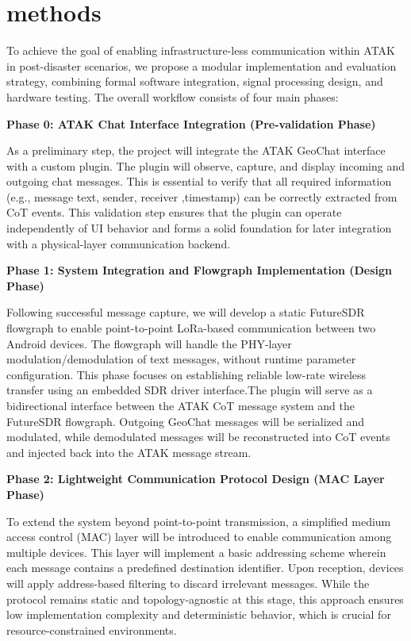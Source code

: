 \section{methods}
To achieve the goal of enabling infrastructure-less communication within ATAK in post-disaster scenarios, we propose a modular implementation and evaluation strategy, combining formal software integration, signal processing design, and hardware testing. The overall workflow consists of four main phases:

\vspace{0.5em}
\noindent\textbf{Phase 0: ATAK Chat Interface Integration (Pre-validation Phase)}\par
As a preliminary step, the project will integrate the ATAK GeoChat interface with a custom plugin. The plugin will observe, capture, and display incoming and outgoing chat messages. This is essential to verify that all required information (e.g., message text, sender, receiver ,timestamp) can be correctly extracted from CoT events. This validation step ensures that the plugin can operate independently of UI behavior and forms a solid foundation for later integration with a physical-layer communication backend.

\vspace{0.5em}
\noindent\textbf{Phase 1: System Integration and Flowgraph Implementation (Design Phase)}\par
Following successful message capture, we will develop a static FutureSDR flowgraph to enable point-to-point LoRa-based communication between two Android devices. The flowgraph will handle the PHY-layer modulation/demodulation of text messages, without runtime parameter configuration. This phase focuses on establishing reliable low-rate wireless transfer using an embedded SDR driver interface.The plugin will serve as a bidirectional interface between the ATAK CoT message system and the FutureSDR flowgraph. Outgoing GeoChat messages will be serialized and modulated, while demodulated messages will be reconstructed into CoT events and injected back into the ATAK message stream.

\vspace{0.5em}
\noindent\textbf{Phase 2: Lightweight Communication Protocol Design (MAC Layer Phase)}\par
To extend the system beyond point-to-point transmission, a simplified medium access control (MAC) layer will be introduced to enable communication among multiple devices. This layer will implement a basic addressing scheme wherein each message contains a predefined destination identifier. Upon reception, devices will apply address-based filtering to discard irrelevant messages. While the protocol remains static and topology-agnostic at this stage, this approach ensures low implementation complexity and deterministic behavior, which is crucial for resource-constrained environments. 

